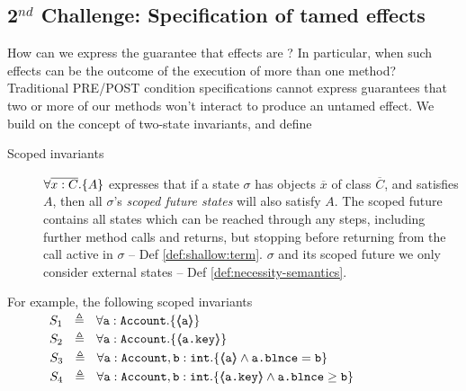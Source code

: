 \subsection{2$^{nd}$ Challenge: Specification of tamed effects}

How can we express the guarantee that effects are \tamed? %
 In particular, when such effects can be the outcome of the execution of more than one method? Traditional PRE/POST condition specifications cannot express guarantees that two or more of our methods won't interact to produce an untamed effect. 
%
We build on the concept of two-state invariants, and define

\begin{description}
\item[{Scoped invariants}] %
{$\forall {\overline{x:C}}.{{\{}}{A}{{\}}}$} expresses that if a {state} $\sigma$ 
 has objects $\overline x$ of class $\overline C$, and satisfies $A$, then all $\sigma$'s \emph{scoped  future  states} will  {also} satisfy  {$A$}. 
The scoped future  {contains all states which can be reached through any steps, including further method calls and returns, but stopping before returning} from the call active in $\sigma$ --  \cf Def  \ref{def:shallow:term}.
 $\sigma$ and its scoped future   we only consider external states -- \cf Def \ref{def:necessity-semantics}.
\end{description}

    
\label{s:bank}
\label{s:bankSpecEx}

\newcommand{\SPSP}{\ \ \ \ \ \  \ \ \ \  }
\noindent
For example, the following scoped invariants\\
$\strut \SPSP  S_1\ \  \triangleq \ \ \TwoStatesN {\prg{a}:\prg{Account}}  {\inside{\prg{a}}} $ 
\\
$\strut  \SPSP  S_2\ \  \triangleq \ \ \TwoStatesN  {\prg{a}:\prg{Account}}  {\inside{\prg{a.key}}} $ 
 \\
$\strut  \SPSP   S_3\ \  \triangleq \ \ \TwoStatesN {\prg{a}:\prg{Account},\prg{b}:\prg{int}}  {\inside{\prg{a}} \wedge \prg{a.\balance}=\prg{b}}  $
\\
$\strut  \SPSP  S_4\ \  \triangleq \ \ \TwoStatesN{ \prg{a}:\prg{Account},\prg{b}:\prg{int} } {\inside{\prg{a.key}} \wedge \prg{a.\balance} \geq \prg{b} } $
 
